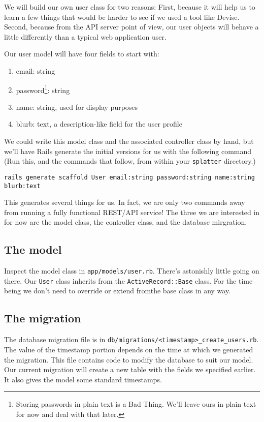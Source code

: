 \documentclass{article}
\begin{document}
We will build our own user class for two reasons:  First, because it will help us to learn a few things that would be harder to see if we used a tool like Devise.  Second, because from the API server point of view, our user objects will behave a little differently than a typical web application user.

\newpage

Our user model will have four fields to start with:  

\begin{enumerate}
  \item  email:   string
  \item  password\footnote{Storing passwords in plain text is a Bad Thing. We'll leave ours in plain text for now and deal with that later.}:  string
  \item  name: string, used for display purposes
  \item  blurb: text, a description-like field for the user profile
\end{enumerate}  

We could write this model class and the associated controller class by hand, but we'll have Rails generate the initial versions for us with the following command (Run this, and the commands that follow, from within your \texttt{splatter} directory.)

\texttt{rails generate scaffold User email:string password:string name:string blurb:text}

This generates several things for us. In fact, we are only two commands away from running a fully functional REST/API service!  The three we are interested in for now are the model class, the controller class, and the database mirgration.

\subsection{The model}
Inspect the model class in \texttt{app/models/user.rb}.  There's astonishly little going on there.  Our \texttt{User} class inherits from the \texttt{ActiveRecord::Base} class.  For the time being we don't need to override or extend fromthe base class in any way.

\subsection{The migration}
The database migration file is in \texttt{db/migrations/<timestamp>\_create\_users.rb}. The value of the timestamp portion depends on the time at which we generated the migration.  This file contains code to modify the database to suit our model.  Our current migration will create a new table with the fields we specified earlier.  It also gives the model some standard timestamps.
\end{document}
